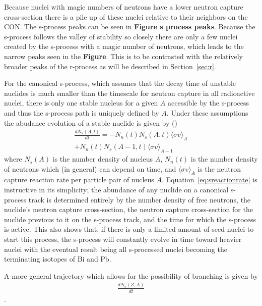 Because nuclei with magic numbers of neutrons have a lower neutron
capture cross-section there is a pile up of these nuclei relative to
their neighbors on the CON.  The s-process peaks can be seen in {\bf
Figure s process peaks}. Because the s-process follows the valley of
stability so closely there are only a few nuclei created by the
s-process with a magic number of neutrons, which leads to the narrow
peaks seen in the {\bf Figure}.  This is to be contrasted with the
relatively broader peaks of the r-process as will be described in
Section~\ref{sec:r}. 

For the canonical s-process, which assumes that the decay time of
unstable nuclides is much smaller than the timescale for neutron
capture in all radioactive nuclei, there is only one stable nucleus
for a given $A$ accessible by the s-process and thus the s-process
path is uniquely defined by $A$.  Under these assumptions the abudance
evolution of a stable nuclide is given by (\citealt{iliadis2008})
\begin{multline}
\label{eq:sreactionrate}
\frac{dN_s(A,t)}{dt} = - N_n(t)N_s(A,t)\langle \sigma v \rangle_A \\
+N_n(t)N_s(A-1,t)\langle \sigma v \rangle_{A-1}
\end{multline}
where $N_s(A)$ is the number density of nucleus $A$, $N_n(t)$ is the
number density of neutrons which (in general) can depend on time, and
$\langle \sigma v \rangle_A$ is the
neutron capture reaction rate per particle pair of nucleus $A$.
Equation~\ref{eq:sreactionrate} is instructive in its simplicity; the
abundance of any nuclide on a canonical s-process track is determined
entirely by the number density of free neutrons, the nuclide's neutron
capture cross-section, the neutron capture cross-section for the
nuclide previous to it on the s-process track, and the time for which
the s-process is active.  This also shows that, if there is only a
limited amount of seed nuclei to start this process, the s-process
will constantly evolve in time toward heavier nuclei with the eventual
result being all s-processed nuclei becoming the terminating isotopes
of Bi and Pb.  

A more general trajectory which allows for the possibility of
branching is given by
\begin{multline}
\frac{dN_s(Z,A)}{dt}
\end{multline}
.

